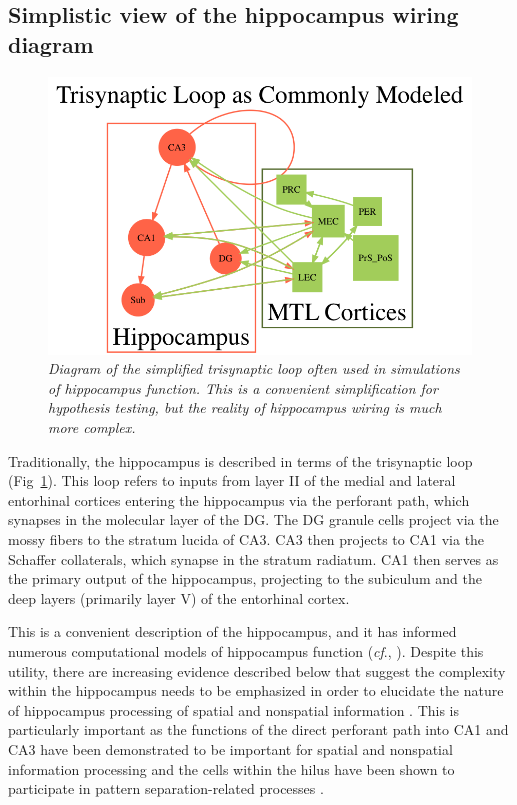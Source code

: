 \documentclass[doc, longtable]{apa6}
\begin{document}
\subsection{Simplistic view of the hippocampus wiring diagram}

\begin{figure}[htp!]
\includegraphics[width=.99\textwidth]{Simple.png}
\centering
\begin{singlespace}
\caption{\textit{Diagram of the simplified trisynaptic loop often used in simulations of hippocampus function. This is a convenient simplification for hypothesis testing, but the reality of hippocampus wiring is much more complex.}}
\label{fig2}
\end{singlespace}
\end{figure}

Traditionally, the hippocampus is described in terms of the trisynaptic loop (Fig~\ref{fig2}). This loop refers to inputs from layer II of the medial and lateral entorhinal cortices entering the hippocampus via the perforant path, which synapses in the molecular layer of the DG. The DG granule cells project via the mossy fibers to the stratum lucida of CA3. CA3 then projects to CA1 via the Schaffer collaterals, which synapse in the stratum radiatum. CA1 then serves as the primary output of the hippocampus, projecting to the subiculum and the deep layers (primarily layer V) of the entorhinal cortex. 

This is a convenient description of the hippocampus, and it has informed numerous computational models of hippocampus function (\textit{cf}., \cite{Rolls1989a,Rolls1996a}). Despite this utility, there are increasing evidence described below that suggest the complexity within the hippocampus needs to be emphasized in order to elucidate the nature of hippocampus processing of spatial and nonspatial information \parencite{Hunsaker2013c}. This is particularly important as the functions of the direct perforant path into CA1 and CA3 have been demonstrated to be important for spatial and nonspatial information processing \parencite{Hunsaker2007c} and the cells within the hilus have been shown to participate in pattern separation-related processes \parencite{Neunuebel2014a}.
\end{document}
